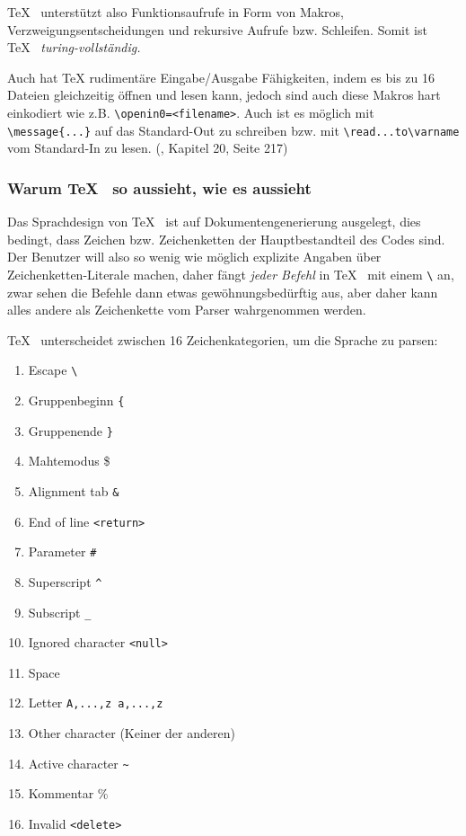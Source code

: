 \TeX~ unterstützt also Funktionsaufrufe in Form von Makros,
Verzweigungsentscheidungen
und rekursive Aufrufe bzw. Schleifen. Somit ist \TeX~ \emph{turing-vollständig.}

Auch hat TeX rudimentäre Eingabe/Ausgabe Fähigkeiten, indem es
bis zu 16 Dateien gleichzeitig öffnen und lesen kann, jedoch sind auch
diese Makros hart einkodiert wie z.B. \lstinline|\openin0=<filename>|.
Auch ist es möglich mit \lstinline|\message{...}| auf das Standard-Out zu schreiben
bzw. mit \lstinline|\read...to\varname| vom Standard-In zu lesen.
(\cite{tex-a}, Kapitel 20, Seite 217)

\subsubsection{Warum \TeX~ so aussieht, wie es aussieht}

Das Sprachdesign von \TeX~ ist auf Dokumentengenerierung ausgelegt, dies
bedingt, dass Zeichen bzw. Zeichenketten der Hauptbestandteil des Codes
sind. Der Benutzer will also so wenig wie möglich explizite Angaben über
Zeichenketten-Literale machen, daher fängt \emph{jeder Befehl} in \TeX~
mit einem \lstinline|\| an, zwar sehen die Befehle dann etwas gewöhnungsbedürftig
aus, aber daher kann alles andere als Zeichenkette vom Parser
wahrgenommen werden.

\TeX~ unterscheidet zwischen 16 Zeichenkategorien, um die Sprache zu parsen:

\begin{enumerate}
  \item Escape \lstinline|\|
  \item Gruppenbeginn \lstinline|{|
  \item Gruppenende \lstinline|}|
  \item Mahtemodus \$
  \item Alignment tab \lstinline|&|
  \item End of line \lstinline|<return>|
  \item Parameter \lstinline|#|
  \item Superscript \lstinline|^|
  \item Subscript \lstinline|_|
  \item Ignored character \lstinline|<null>|
  \item Space
  \item Letter \lstinline|A,...,z a,...,z|
  \item Other character (Keiner der anderen)
  \item Active character \lstinline|~|
  \item Kommentar \%
  \item Invalid \lstinline|<delete>|
\end{enumerate}

